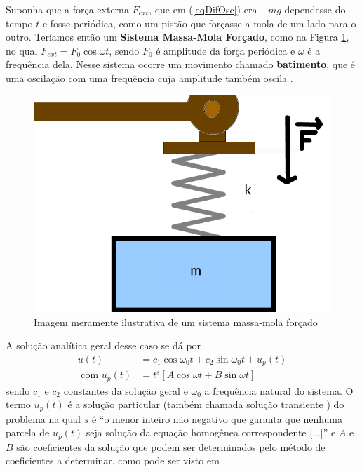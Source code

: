                Suponha que a força externa $F_{ext}$, que em (\ref{eqDifOsc}) era $-mg$ dependesse do tempo $t$ e fosse periódica, como um pistão que forçasse a mola de um lado para o outro. Teríamos então um \textbf{Sistema Massa-Mola Forçado}, como na Figura \ref{fig:forcedMMS}, no qual $F_{ext} = F_0\cos{\omega t}$, sendo $F_0$ é amplitude da força periódica e $\omega$ é a frequência dela. Nesse sistema ocorre um movimento chamado \textbf{batimento}, que é uma oscilação com uma frequência cuja amplitude também oscila \cite{regiIntro}.
                
                \begin{figure}[H]
                    \centering
                    \includegraphics[scale=.3]{imagens/ForcedMass_spring.png}
                    \caption{Imagem meramente ilustrativa de um sistema massa-mola forçado}
                    \label{fig:forcedMMS}
                \end{figure}
                
                A solução analítica geral desse caso se dá por
                \begin{align}
                    u(t) &= c_1\cos{\omega_0t} + c_2\sin{\omega_0t} + u_p(t) \\\text{ com		}
                    \label{solPart}
                    u_p(t) &= t^s[A\cos{\omega t} + B\sin{\omega t}]
                \end{align}
                sendo $c_1$ e $c_2$ constantes da solução geral e $\omega_0$ a frequência natural do sistema. O termo $u_p(t)$ é a solução particular (também chamada solução transiente \cite{boyce9}) do problema na qual $s$ é ``o menor inteiro não negativo que garanta que nenhuma parcela de $u_p(t)$ seja solução da equação homogênea correspondente [...]'' \cite{regiIntro} e $A$ e $B$ são coeficientes da solução que podem ser determinados pelo método de coeficientes a determinar, como pode ser visto em \cite{regiIntro}.
                
